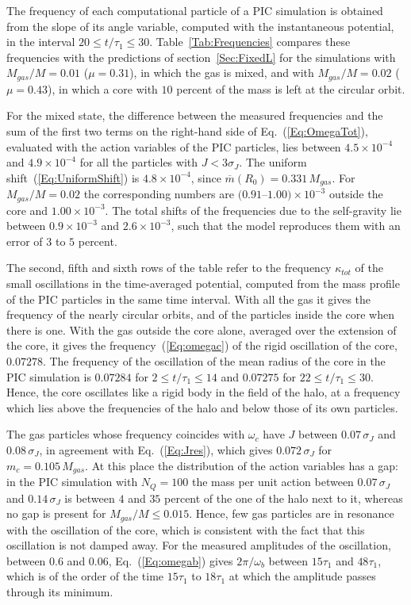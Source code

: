 \documentclass[prd,aps,nofootinbib,superscriptaddress,amsmath,amssymb]{revtex4}
\begin{document}
The frequency of each computational particle of a PIC simulation is obtained from the slope of its angle variable, computed with the instantaneous potential, in the interval $20\leq t/\tau_1\leq 30$. Table~\ref{Tab:Frequencies} compares these frequencies with the predictions of section~\ref{Sec:FixedL} for the simulations with $M_{gas}/M = 0.01$ ($\mu = 0.31$), in which the gas is mixed, and with $M_{gas}/M = 0.02$ ($\mu = 0.43$), in which a core with $10$ percent of the mass is left at the circular orbit.

For the mixed state, the difference between the measured frequencies and the sum of the first two terms on the right-hand side of Eq.~(\ref{Eq:OmegaTot}), evaluated with the action variables of the PIC particles, lies between $4.5\times 10^{-4}$ and $4.9\times 10^{-4}$ for all the particles with $J < 3\sigma_J$. The uniform shift~(\ref{Eq:UniformShift}) is $4.8\times 10^{-4}$, since $\overline{m}(R_0) = 0.331\, M_{gas}$. For $M_{gas}/M = 0.02$ the corresponding numbers are $(0.91$--$1.00)\times 10^{-3}$ outside the core and $1.00\times 10^{-3}$. The total shifts of the frequencies due to the self-gravity lie between $0.9\times 10^{-3}$ and $2.6\times 10^{-3}$, such that the model reproduces them with an error of $3$ to $5$ percent.

The second, fifth and sixth rows of the table refer to the frequency $\kappa_{tot}$ of the small oscillations in the time-averaged potential, computed from the mass profile of the PIC particles in the same time interval. With all the gas it gives the frequency of the nearly circular orbits, and of the particles inside the core when there is one. With the gas outside the core alone, averaged over the extension of the core, it gives the frequency~(\ref{Eq:omegac}) of the rigid oscillation of the core, $0.07278$. The frequency of the oscillation of the mean radius of the core in the PIC simulation is $0.07284$ for $2\leq t/\tau_1\leq 14$ and $0.07275$ for $22\leq t/\tau_1\leq 30$. Hence, the core oscillates like a rigid body in the field of the halo, at a frequency which lies above the frequencies of the halo and below those of its own particles.

The gas particles whose frequency coincides with $\omega_c$ have $J$ between $0.07\,\sigma_J$ and $0.08\,\sigma_J$, in agreement with Eq.~(\ref{Eq:Jres}), which gives $0.072\,\sigma_J$ for $m_c = 0.105\, M_{gas}$. At this place the distribution of the action variables has a gap: in the PIC simulation with $N_Q = 100$ the mass per unit action between $0.07\,\sigma_J$ and $0.14\,\sigma_J$ is between $4$ and $35$ percent of the one of the halo next to it, whereas no gap is present for $M_{gas}/M\leq 0.015$. Hence, few gas particles are in resonance with the oscillation of the core, which is consistent with the fact that this oscillation is not damped away. For the measured amplitudes of the oscillation, between $0.6$ and $0.06$, Eq.~(\ref{Eq:omegab}) gives $2\pi/\omega_b$ between $15\tau_1$ and $48\tau_1$, which is of the order of the time $15\tau_1$ to $18\tau_1$ at which the amplitude passes through its minimum.
\end{document}
